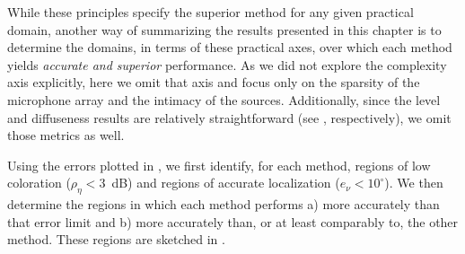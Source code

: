 While these principles specify the superior method for any given practical domain, another way of summarizing the results presented in this chapter is to determine the domains, in terms of these practical axes, over which each method yields \textit{accurate and superior} performance.
As we did not explore the complexity axis explicitly, here we omit that axis and focus only on the sparsity of the microphone array and the intimacy of the sources.
Additionally, since the level and diffuseness results are relatively straightforward (see , respectively), we omit those metrics as well.

Using the errors plotted in , we first identify, for each method, regions of low coloration ($\rho_\eta < 3$~dB) and regions of accurate localization ($e_\nu < 10^\circ$).
We then determine the regions in which each method performs a) more accurately than that error limit and b) more accurately than, or at least comparably to, the other method.
These regions are sketched in .

